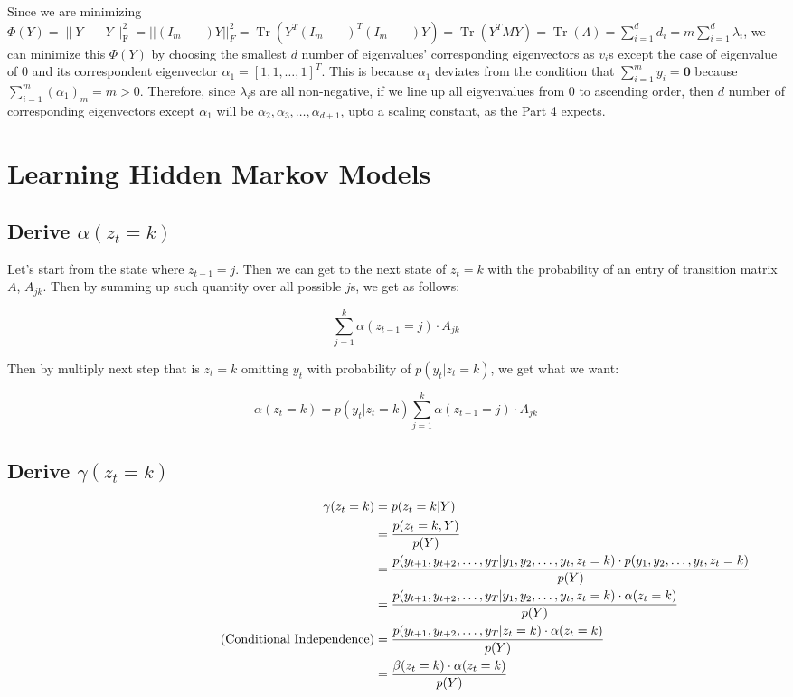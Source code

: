 \documentclass[10pt]{article}
\DeclareMathOperator{\Wn}{W_n}
\newcommand{\comment}[1]{%
  \text{\phantom{(#1)}} \tag{#1}
}
\begin{document}
Since we are minimizing $\Phi(Y) =\|Y- \Wn Y\|_{\mathrm{F}}^{2} = ||(I_m - \Wn)Y||_F^2=\operatorname{Tr}(Y^T(I_m - \Wn)^T(I_m - \Wn)Y) = \operatorname{Tr}(Y^TMY) = \operatorname{Tr}(\Lambda) =  \sum_{i=1}^{d} d_i =  m\sum_{i=1}^d\lambda_i$, we can minimize this $\Phi(Y)$ by choosing the smallest $d$ number of eigenvalues' corresponding eigenvectors as $v_i$s except the case of eigenvalue of $0$ and its correspondent eigenvector $\alpha_1 = [1, 1, \hdots, 1]^T$. This is because $\alpha_1$ deviates from the condition that $\sum_{i=1}^{m} y_{i} = \mathbf{0}$ because $\sum_{i=1}^{m} (\alpha_1)_m = m  >0$. Therefore, since $\lambda_i$s are all non-negative, if we line up all eigvenvalues from $0$ to ascending order, then $d$ number of corresponding eigenvectors except $\alpha_1$ will be $\alpha_2, \alpha_3, \hdots, \alpha_{d+1}$, upto a scaling constant, as the Part 4 expects. 


\section{Learning Hidden Markov Models}
\subsection{Derive $\alpha(z_{t}=k)$}

Let's start from the state where $z_{t-1} = j$. Then we can get to the next state of $z_{t} = k$ with the probability of an entry of transition matrix $A$, $A_{jk}$.
Then by summing up such quantity over all possible $j$s, we get as follows:

$$
\sum_{j=1}^k \alpha(z_{t-1}=j)\cdot A_{jk}
$$

Then by multiply next step that is $z_{t} = k$ omitting $y_{t}$ with probability of $p(y_{t}|z_{t}=k)$, we get what we want:

$$
\alpha(z_{t}=k) = p(y_{t}|z_{t}=k)\sum_{j=1}^k \alpha(z_{t-1}=j)\cdot A_{jk}
$$

\subsection{Derive $\gamma(z_{t}=k)$}
\begin{align*}
\gamma(z_{t}=k) &= p(z_t =k | Y)\\
&= \frac{p(z_t=k , Y)}{p(Y)}\\
&= \frac{p(y_{t+1}, y_{t+2}, \hdots, y_T|y_1, y_2, \hdots, y_t, z_t = k)\cdot p(y_1, y_2, \hdots, y_t, z_t = k)}{p(Y)}\\
&= \frac{p(y_{t+1}, y_{t+2}, \hdots, y_T|y_1, y_2, \hdots, y_t, z_t = k)\cdot \alpha(z_t = k)}{p(Y)}\\
\comment{Conditional Independence} &= \frac{p(y_{t+1}, y_{t+2}, \hdots, y_T|z_t = k)\cdot \alpha(z_t = k)}{p(Y)}\\
&= \frac{\beta(z_t = k)\cdot \alpha(z_t = k)}{p(Y)}\\
\end{align*}
\end{document}
